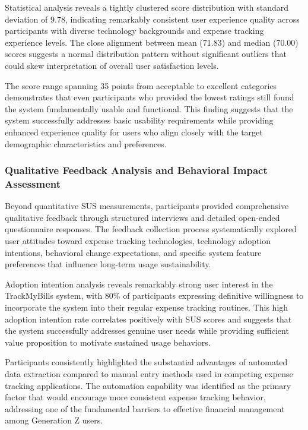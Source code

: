 Statistical analysis reveals a tightly clustered score distribution with standard deviation of 9.78, indicating remarkably consistent user experience quality across participants with diverse technology backgrounds and expense tracking experience levels. The close alignment between mean (71.83) and median (70.00) scores suggests a normal distribution pattern without significant outliers that could skew interpretation of overall user satisfaction levels.

The score range spanning 35 points from acceptable to excellent categories demonstrates that even participants who provided the lowest ratings still found the system fundamentally usable and functional. This finding suggests that the system successfully addresses basic usability requirements while providing enhanced experience quality for users who align closely with the target demographic characteristics and preferences.

\subsubsection{Qualitative Feedback Analysis and Behavioral Impact Assessment}
Beyond quantitative SUS measurements, participants provided comprehensive qualitative feedback through structured interviews and detailed open-ended questionnaire responses. The feedback collection process systematically explored user attitudes toward expense tracking technologies, technology adoption intentions, behavioral change expectations, and specific system feature preferences that influence long-term usage sustainability.

Adoption intention analysis reveals remarkably strong user interest in the TrackMyBills system, with 80\% of participants expressing definitive willingness to incorporate the system into their regular expense tracking routines. This high adoption intention rate correlates positively with SUS scores and suggests that the system successfully addresses genuine user needs while providing sufficient value proposition to motivate sustained usage behaviors.

Participants consistently highlighted the substantial advantages of automated data extraction compared to manual entry methods used in competing expense tracking applications. The automation capability was identified as the primary factor that would encourage more consistent expense tracking behavior, addressing one of the fundamental barriers to effective financial management among Generation Z users.

